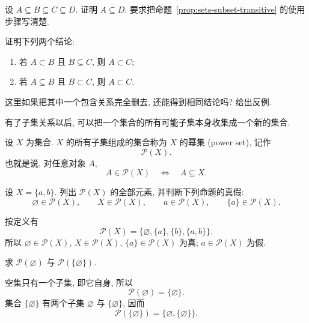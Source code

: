 \documentclass[usesamecnt, thmcnt=section, lang=cn, newtx, 10pt, scheme=chinese]{elegantbook}
\begin{document}
\begin{exercise}\label{ex:sets-subset-chain}
设 $A\subseteq B\subseteq C\subseteq D$. 证明 $A\subseteq D$. 要求把命题~\ref{prop:sets-subset-transitive} 的使用步骤写清楚.
\end{exercise}

\begin{exercise}\label{ex:sets-subset-proper}
证明下列两个结论:
\begin{enumerate}[label=\rm(\arabic*)]
  \item 若 $A\subset B$ 且 $B\subseteq C$, 则 $A\subset C$;
  \item 若 $A\subseteq B$ 且 $B\subset C$, 则 $A\subset C$.
\end{enumerate}
这里如果把其中一个包含关系完全删去, 还能得到相同结论吗? 给出反例.
\end{exercise}

有了子集关系以后, 可以把一个集合的所有可能子集本身收集成一个新的集合.

\begin{definition}\label{def:sets-powerset}
设 $X$ 为集合. $X$ 的所有子集组成的集合称为 $X$ 的{\color{blue}幂集 (power set)}, 记作
\[
 \mathscr P(X).
\]
也就是说, 对任意对象 $A$,
\[
 A\in\mathscr P(X)
 \quad\Longleftrightarrow\quad
 A\subseteq X.
\]
\end{definition}

\begin{concept}\label{con:sets-05}
设 $X=\{a,b\}$. 列出 $\mathscr P(X)$ 的全部元素, 并判断下列命题的真假:
\[
 \varnothing\in\mathscr P(X),\qquad X\in\mathscr P(X),\qquad a\in\mathscr P(X),\qquad \{a\}\in\mathscr P(X).
\]
\end{concept}

\begin{solution} 按定义有
\[
 \mathscr P(X)=\{\varnothing,\{a\},\{b\},\{a,b\}\}.
\]
所以 $\varnothing\in\mathscr P(X)$, $X\in\mathscr P(X)$, $\{a\}\in\mathscr P(X)$ 为真; $a\in\mathscr P(X)$ 为假.
\end{solution}

\begin{example}
求 $\mathscr P(\varnothing)$ 与 $\mathscr P(\{\varnothing\})$.
\end{example}

\begin{solution}
空集只有一个子集, 即它自身, 所以
\[
 \mathscr P(\varnothing)=\{\varnothing\}.
\]
集合 $\{\varnothing\}$ 有两个子集 $\varnothing$ 与 $\{\varnothing\}$, 因而
\[
 \mathscr P(\{\varnothing\})=\{\varnothing,\{\varnothing\}\}.
\]
\end{solution}
\end{document}
